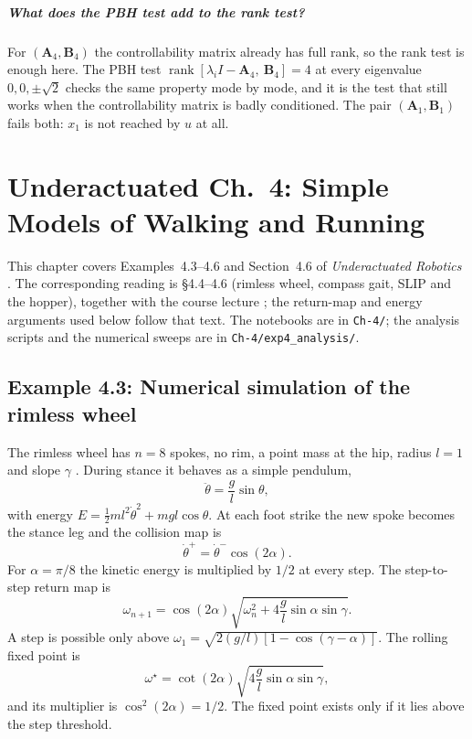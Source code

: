 \documentclass[11pt]{report}
\renewcommand{\chaptermark}[1]{\markboth{#1}{}}
\newcommand{\bA}{\mathbf{A}}
\newcommand{\bB}{\mathbf{B}}
\begin{document}
\paragraph{What does the PBH test add to the rank test?}  For
$(\bA_4,\bB_4)$ the controllability matrix already has full rank, so the rank
test is enough here.  The PBH test
$\operatorname{rank}[\lambda_i I-\bA_4,\ \bB_4]=4$ at every eigenvalue
$0,0,\pm\sqrt2$ checks the same property mode by mode, and it is the test that
still works when the controllability matrix is badly conditioned.  The pair
$(\bA_1,\bB_1)$ fails both: $x_1$ is not reached by $u$ at all.

\chapter[Underactuated Ch.~4: Simple Models of Walking and Running]%
        {Underactuated Ch.~4: Simple Models of Walking and Running}
\chaptermark{Ch.~4: Walking and Running}

This chapter covers Examples~4.3--4.6 and Section~4.6 of
\emph{Underactuated Robotics} \cite{tedrake-simplelegs}.  The corresponding
reading is \S4.4--4.6 (rimless wheel, compass gait, SLIP and the hopper),
together with the course lecture \cite{lectures}; the return-map and energy
arguments used below follow that text.  The notebooks are
in \texttt{Ch-4/}; the analysis scripts and the numerical sweeps are in
\texttt{Ch-4/exp4\_analysis/}.

\section{Example 4.3: Numerical simulation of the rimless wheel}
\label{sec:ex43}

The rimless wheel has $n=8$ spokes, no rim, a point mass at the hip, radius
$l=1$ and slope $\gamma$ \cite{tedrake-simplelegs}.  During stance it behaves as a simple pendulum,
\[
\ddot\theta=\frac{g}{l}\sin\theta,
\]
with energy $E=\frac12ml^2\dot\theta^2+mgl\cos\theta$.  At each foot strike
the new spoke becomes the stance leg and the collision map is
\[
\dot\theta^+=\dot\theta^-\cos(2\alpha).
\]
For $\alpha=\pi/8$ the kinetic energy is multiplied by $1/2$ at every step.
The step-to-step return map is
\[
\omega_{n+1}=\cos(2\alpha)\sqrt{\omega_n^2+4\frac{g}{l}\sin\alpha\sin\gamma}.
\]
A step is possible only above
$\omega_1=\sqrt{2(g/l)[1-\cos(\gamma-\alpha)]}$.  The rolling fixed point is
\[
\omega^\star=\cot(2\alpha)\sqrt{4\frac{g}{l}\sin\alpha\sin\gamma},
\]
and its multiplier is $\cos^2(2\alpha)=1/2$.  The fixed point exists only if
it lies above the step threshold.
\end{document}
